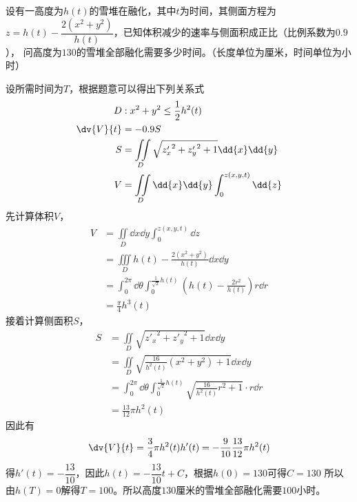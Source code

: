 \begin{example}
    设有一高度为$h(t)$的雪堆在融化，其中$t$为时间，其侧面方程为$z=h(t)-\dfrac{2(x^2+y^2)}{h(t)}$，已知体积减少的速率与侧面积成正比（比例系数为$0.9$），
    问高度为$130$的雪堆全部融化需要多少时间。（长度单位为厘米，时间单位为小时）
\end{example}
\begin{solution}
    设所需时间为$T$，根据题意可以得出下列关系式
    \begin{align*}
        D         & : x^2+y^2\leq \frac{1}{2}h^2(t)                             \\
        \dv{V}{t} & = -0.9S                                                     \\
        S         & = \iint\limits_D \sqrt{{z'_x}^2 + {z'_y}^2 + 1}\dd{x}\dd{y} \\
        V         & = \iint\limits_D \dd{x}\dd{y}\int_0^{z(x,y,t)} \dd{z}       \\
    \end{align*}
    先计算体积$V$，
    \begin{align*}
        V & = \iint\limits_D \dd{x}\dd{y}\int_0^{z(x,y,t)} \dd{z}                                                 \\
          & = \iiint\limits_D h(t)-\frac{2(x^2+y^2)}{h(t)}\dd{x}\dd{y}                                            \\
          & = \int_0^{2\pi} \dd{\theta}\int_0^{\frac{1}{\sqrt{2}}h(t)} \left(h(t)-\frac{2r^2}{h(t)}\right)r\dd{r} \\
          & = \frac{\pi}{4}h^3(t)
    \end{align*}
    接着计算侧面积$S$，
    \begin{align*}
        S & = \iint\limits_D \sqrt{{z'_x}^2 + {z'_y}^2 + 1}\dd{x}\dd{y}                                               \\
          & = \iint\limits_D \sqrt{\frac{16}{h^2(t)}(x^2+y^2) + 1} \dd{x}\dd{y}                                       \\
          & = \int_0^{2\pi} \dd{\theta} \int_0^{\frac{1}{\sqrt{2}}h(t)} \sqrt{\frac{16}{h^2(t)}r^2 + 1} \cdot r\dd{r} \\
          & = \frac{13}{12}\pi h^2(t)
    \end{align*}
    因此有
    \[ \dv{V}{t} = \frac{3}{4}\pi h^2(t) h'(t) = -\frac{9}{10} \frac{13}{12}\pi h^2(t) \]
    得$h'(t) = -\dfrac{13}{10}$，因此$h(t)=-\dfrac{13}{10}t + C$，根据$h(0)=130$可得$C=130$
    所以由$h(T)=0$解得$T=100$。所以高度$130$厘米的雪堆全部融化需要$100$小时。
\end{solution}

